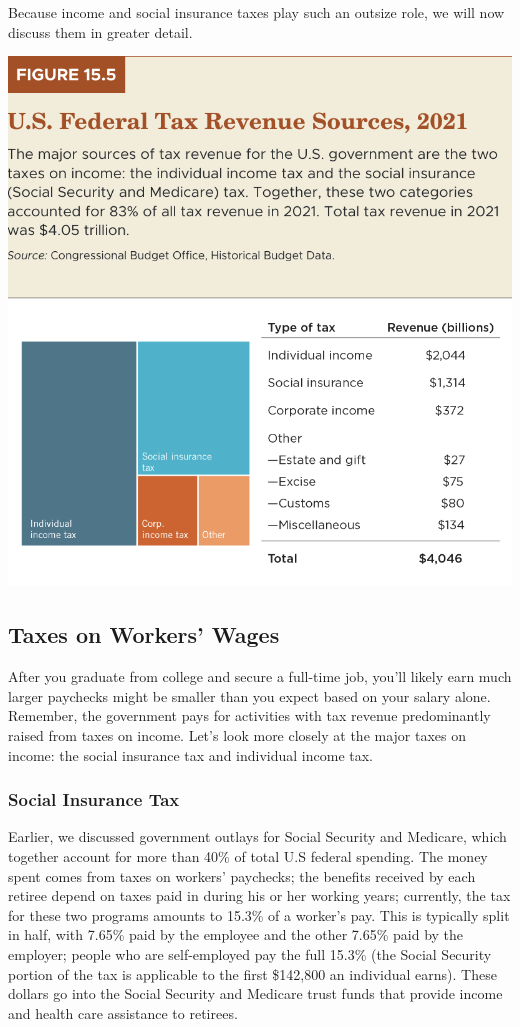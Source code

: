 \documentclass[11pt]{article} %
\begin{document}
Because income and social insurance taxes play such an outsize role, we will now discuss them in greater detail.
\begin{center}
\includegraphics[scale=0.5]{images/Figure 15.5.png}
\end{center}
\subsection*{Taxes on Workers' Wages}
After you graduate from college and secure a full-time job, you'll likely earn much larger paychecks might be smaller than you expect based on your salary alone. Remember, the government pays for activities with tax revenue predominantly raised from taxes on income. Let's look more closely at the major taxes on income: the social insurance tax and individual income tax.

\subsubsection*{Social Insurance Tax}
Earlier, we discussed government outlays for Social Security and Medicare, which together account for more than 40\% of total U.S federal spending. The money spent comes from taxes on workers' paychecks; the benefits received by each retiree depend on taxes paid in during his or her working years; currently, the tax for these two programs amounts to 15.3\% of a worker's pay. This is typically split in half, with 7.65\% paid by the employee and the other 7.65\% paid by the employer; people who are self-employed pay the full 15.3\% (the Social Security portion of the tax is applicable to the first \$142,800 an individual earns). These dollars go into the Social Security and Medicare trust funds that provide income and health care assistance to retirees.
\end{document}
